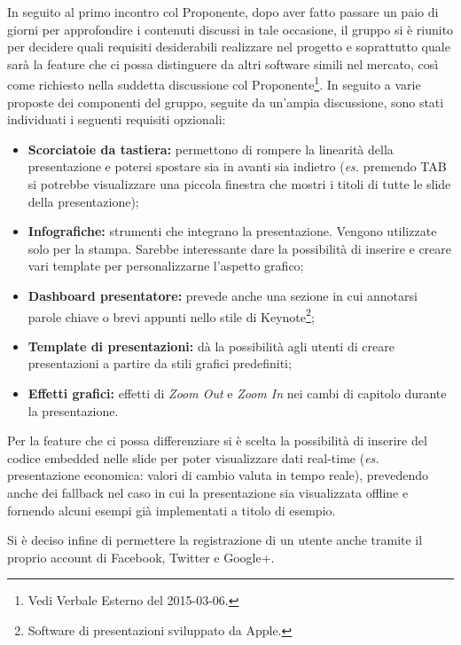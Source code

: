 In seguito al primo incontro col Proponente, dopo aver fatto passare un paio di giorni per approfondire i contenuti discussi in tale occasione, il gruppo si è riunito per decidere quali requisiti desiderabili realizzare nel progetto \PROGETTO{} e soprattutto quale sarà la feature che ci possa distinguere da altri software simili nel mercato, così come richiesto nella suddetta discussione col Proponente\footnote{Vedi Verbale Esterno del 2015-03-06.}.
In seguito a varie proposte dei componenti del gruppo, seguite da un'ampia discussione, sono stati individuati i seguenti requisiti opzionali:
\begin{itemize}
	\item \textbf{Scorciatoie da tastiera:} permettono di rompere la linearità della presentazione e potersi spostare sia in avanti sia indietro (\textit{es.} premendo TAB si potrebbe visualizzare una piccola finestra che mostri i titoli di tutte le slide della presentazione);
	\item \textbf{Infografiche:} strumenti che integrano la presentazione. Vengono utilizzate solo per la stampa. Sarebbe interessante dare la possibilità di inserire e creare vari template per personalizzarne l'aspetto grafico;
	\item \textbf{Dashboard presentatore:}  prevede anche una sezione in cui annotarsi parole chiave o brevi appunti nello stile di Keynote\footnote{Software di presentazioni sviluppato da Apple.};
	\item \textbf{Template di presentazioni:} dà la possibilità agli utenti di creare presentazioni a partire da stili grafici predefiniti;
	\item \textbf{Effetti grafici:} effetti di \textit{Zoom Out} e \textit{Zoom In} nei cambi di capitolo durante la presentazione.
\end{itemize}

\noindent Per la feature che ci possa differenziare si è scelta la possibilità di inserire del codice embedded nelle slide per poter visualizzare dati real-time (\textit{es.} presentazione economica: valori di cambio valuta in tempo reale), prevedendo anche dei fallback nel caso in cui la presentazione sia visualizzata offline e fornendo alcuni esempi già implementati a titolo di esempio.

\noindent Si è deciso infine di permettere la registrazione di un utente anche tramite il proprio account di Facebook, Twitter e Google+.